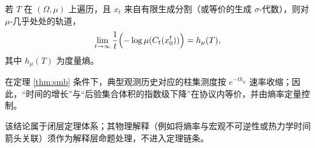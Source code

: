 \begin{theorem}\label{thm:smb}
若 $T$ 在 $(\Omega,\mu)$ 上遍历，且 $x_t$ 来自有限生成分割（或等价的生成 $\sigma$-代数），则对 $\mu$-几乎处处的轨道，
\[
\lim_{t\to\infty}\frac{1}{t}\Bigl(-\log\mu(C_t(x_0^t))\Bigr)=h_\mu(T),
\]
其中 $h_\mu(T)$ 为度量熵。
\end{theorem}

\begin{corollary}[时间箭头的协议内刻画]\label{cor:time-arrow}
在定理 \ref{thm:smb} 条件下，典型观测历史对应的柱集测度按 $e^{-t h_\mu}$ 速率收缩；因此，“时间的增长”与“后验集合体积的指数级下降”在协议内等价，并由熵率定量控制。
\end{corollary}

\begin{remark}
该结论属于闭层定理体系；其物理解释（例如将熵率与宏观不可逆性或热力学时间箭头关联）须作为解释层命题处理，不进入定理链条。
\end{remark}

